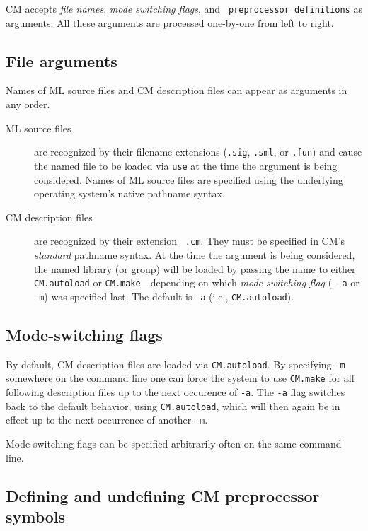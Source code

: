 \documentclass[titlepage,letterpaper]{article}
\begin{document}
CM accepts {\em file names}, {\em mode switching flags}, and {\tt
preprocessor definitions} as arguments.  All these arguments are
processed one-by-one from left to right.

\subsection{File arguments}

Names of ML source files and CM description files can appear as
arguments in any order.

\begin{description}
\item[ML source files] are recognized by their filename extensions
({\tt .sig}, {\tt .sml}, or {\tt .fun}) and cause the named file to be
loaded via {\tt use} at the time the argument is being considered.
Names of ML source files are specified using the underlying operating
system's native pathname syntax.
\item[CM description files] are recognized by their extension {\tt
.cm}.  They must be specified in CM's {\em standard} pathname syntax.
At the time the argument is being considered, the named library (or
group) will be loaded by passing the name to either {\tt CM.autoload}
or {\tt CM.make}---depending on which {\em mode switching flag} ({\tt
-a} or {\tt -m}) was specified last.  The default is {\tt -a} (i.e.,
{\tt CM.autoload}).
\end{description}

\subsection{Mode-switching flags}

By default, CM description files are loaded via {\tt CM.autoload}.  By
specifying {\tt -m} somewhere on the command line one can force the
system to use {\tt CM.make} for all following description files up to
the next occurence of {\tt -a}.  The {\tt -a} flag switches back to
the default behavior, using {\tt CM.autoload}, which will then again
be in effect up to the next occurrence of another {\tt -m}.

Mode-switching flags can be specified arbitrarily often on the same
command line.

\subsection{Defining and undefining CM preprocessor symbols}
\label{sec:cmdline:defundef}
\end{document}
